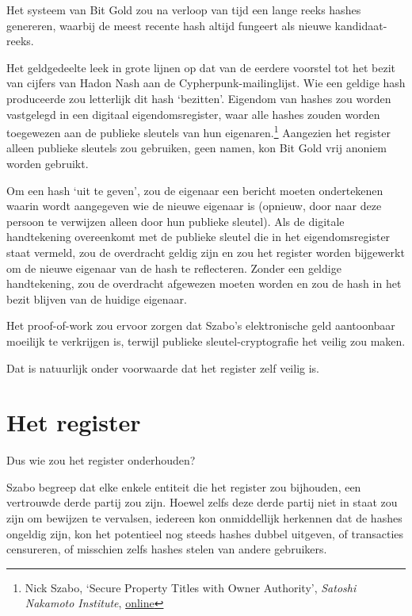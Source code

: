 \documentclass[smalldemyvopaper,11pt,twoside,onecolumn,openright,extrafontsizes,hidelinks]{memoir}
\begin{document}
Het systeem van Bit Gold zou na verloop van tijd een lange reeks hashes
genereren, waarbij de meest recente hash altijd fungeert als nieuwe
kandidaat-reeks.

Het geldgedeelte leek in grote lijnen op dat van de eerdere voorstel tot
het bezit van cijfers van Hadon Nash aan de Cypherpunk-mailinglijst. Wie
een geldige hash produceerde zou letterlijk dit hash `bezitten'.
Eigendom van hashes zou worden vastgelegd in een digitaal
eigendomsregister, waar alle hashes zouden worden toegewezen aan de
publieke sleutels van hun eigenaren.\footnote{Nick Szabo, `Secure
  Property Titles with Owner Authority', \emph{Satoshi Nakamoto
  Institute},
  \href{https://nakamotoinstitute.org/library/secure-property-titles/}{online}}
Aangezien het register alleen publieke sleutels zou gebruiken, geen
namen, kon Bit Gold vrij anoniem worden gebruikt.

Om een hash `uit te geven', zou de eigenaar een bericht moeten
ondertekenen waarin wordt aangegeven wie de nieuwe eigenaar is (opnieuw,
door naar deze persoon te verwijzen alleen door hun publieke sleutel).
Als de digitale handtekening overeenkomt met de publieke sleutel die in
het eigendomsregister staat vermeld, zou de overdracht geldig zijn en
zou het register worden bijgewerkt om de nieuwe eigenaar van de hash te
reflecteren. Zonder een geldige handtekening, zou de overdracht
afgewezen moeten worden en zou de hash in het bezit blijven van de
huidige eigenaar.

Het proof-of-work zou ervoor zorgen dat Szabo's elektronische geld
aantoonbaar moeilijk te verkrijgen is, terwijl publieke
sleutel-cryptografie het veilig zou maken.

Dat is natuurlijk onder voorwaarde dat het register zelf veilig is.

\section{Het register}\label{het-register}

Dus wie zou het register onderhouden?

Szabo begreep dat elke enkele entiteit die het register zou bijhouden,
een vertrouwde derde partij zou zijn. Hoewel zelfs deze derde partij
niet in staat zou zijn om bewijzen te vervalsen, iedereen kon
onmiddellijk herkennen dat de hashes ongeldig zijn, kon het potentieel
nog steeds hashes dubbel uitgeven, of transacties censureren, of
misschien zelfs hashes stelen van andere gebruikers.
\end{document}

